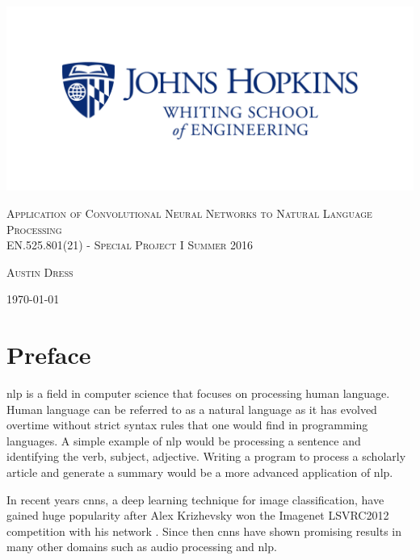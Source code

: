 \documentclass[12pt]{article}
\begin{document}
\begin{titlepage}
	\centering
	\includegraphics[width=\textwidth]{jhu_logo.png}\par\vspace{2cm}
	{\scshape\Huge Application of Convolutional Neural Networks to Natural Language Processing \\
	\vspace{1.5cm}
	 \scshape\Large EN.525.801(21) - Special Project I Summer 2016\par}
	{\scshape \Large Austin Dress\par} 
	\vspace{0.75cm}
	\vfill
	{\large \today\par}
\end{titlepage}

\tableofcontents
\listoftables

\newpage

\section{Preface} 
\ac{nlp} is a field in computer science that focuses on processing human language. Human language can be referred to as a natural language as it has evolved overtime without strict syntax rules that one would find in programming languages. A simple example of \ac{nlp} would be processing a sentence and identifying the verb, subject, adjective. Writing a program to process a scholarly article and generate a summary would be a more advanced application of \ac{nlp}.

In recent years \ac{cnn}s, a deep learning technique for image classification, have gained huge popularity after Alex Krizhevsky won the Imagenet LSVRC2012 competition with his network \cite{alex}. Since then \ac{cnn}s have shown promising results in many other domains such as audio processing and \ac{nlp}. 
\end{document}
